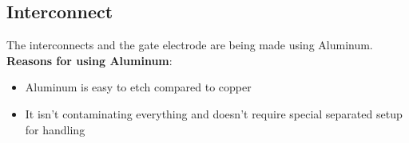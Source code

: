 \subsection{Interconnect}
The interconnects and the gate electrode are being made using Aluminum.\\

\textbf{Reasons for using Aluminum}:\begin{itemize}
\item Aluminum is easy to etch compared to copper
\item It isn't contaminating everything and doesn't require special separated setup for handling
\end{itemize}
